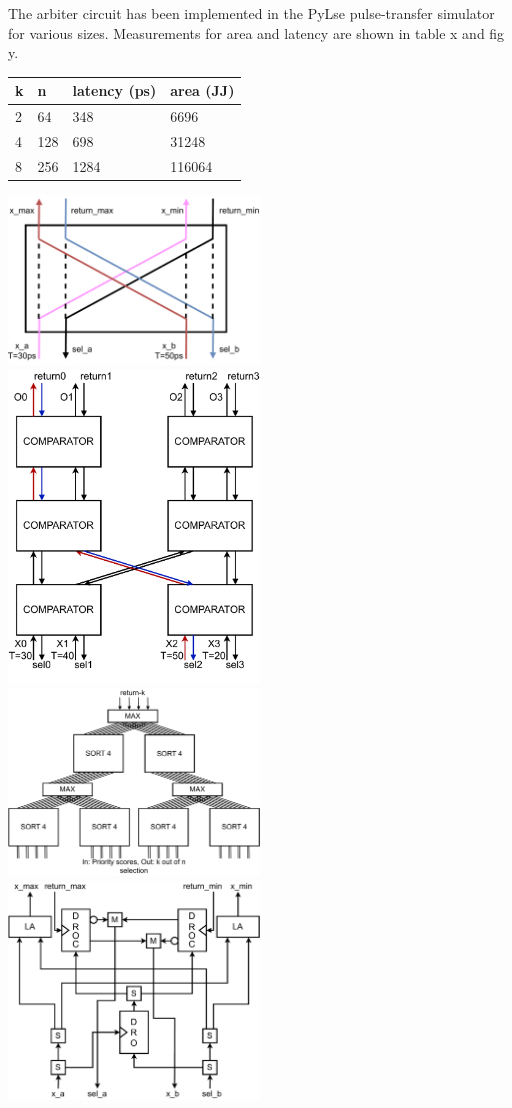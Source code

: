 \documentclass{article}
\begin{document}
The arbiter circuit has been implemented in the PyLse
pulse-transfer simulator for various sizes. Measurements for
area and latency are shown in table x and fig y.

\begin{table}[]
\begin{tabular}{|l|l|l|l|}
\hline
k & n   & latency (ps) & area (JJ) \\ \hline
2 & 64  & 348          & 6696      \\ \hline
4 & 128 & 698          & 31248     \\ \hline
8 & 256 & 1284         & 116064    \\ \hline
\end{tabular}
\end{table}

\includegraphics*[width=0.5\textwidth]{diagrams/comparator.drawio.pdf}
\includegraphics*[width=0.5\textwidth]{diagrams/sort4.drawio.pdf}
\includegraphics*[width=0.5\textwidth]{diagrams/arbiterk4n16.drawio.pdf}
\includegraphics*[width=0.5\textwidth]{diagrams/circuit_comparator.drawio.pdf}
\end{document}
